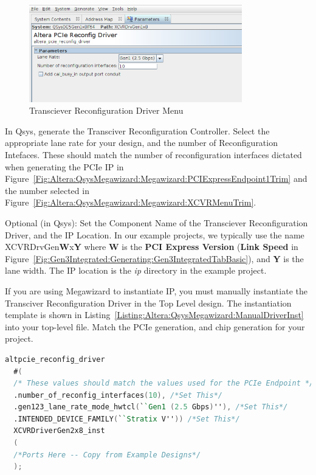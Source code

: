 \documentclass{refrep}
\newcommand{\Directory}[1]{\textit{#1}}
\newcommand{\ConfigSetting}[1]{\textbf{#1}}
\begin{document}
\begin{figure}[H]
  \includegraphics[width=350px,center]{ReconfigDriverMenu.png}
  \caption{Transciever Reconfiguration Driver Menu}
  \label{Fig:Altera:QsysMegawizard:Megawizard:ReconfigDriverMenu}
\end{figure}

In Qsys, generate the Transciver Reconfiguration Controller. Select the
appropriate lane rate for your design, and the number of Reconfiguration
Intefaces. These should match the number of reconfiguration interfaces dictated
when generating the PCIe IP in
Figure~\ref{Fig:Altera:QsysMegawizard:Megawizard:PCIExpressEndpoint1Trim} and
the number selected in
Figure~\ref{Fig:Altera:QsysMegawizard:Megawizard:XCVRMenuTrim}.

Optional (in Qsys): Set the Component Name of the Transciever Reconfiguration
Driver, and the IP Location. In our example projects, we typically use the name
XCVRDrvGen\ConfigSetting{W}x\ConfigSetting{Y} where \ConfigSetting{W} is the
\ConfigSetting{PCI Express Version} (\ConfigSetting{Link Speed} in
Figure~\ref{Fig:Gen3Integrated:Generating:Gen3IntegratedTabBasic}), and
\textbf{Y} is the lane width. The IP location is the \Directory{ip} directory in
the example project.

If you are using Megawizard to instantiate IP, you must manually instantiate the
Transciver Reconfiguration Driver in the Top Level design. The instantiation
template is shown in
Listing~\ref{Listing:Altera:QsysMegawizard:ManualDriverInst} into your top-level
file.  Match the PCIe generation, and chip generation for your project.
\begin{lstlisting}[basicstyle=\footnotesize\ttfamily,language=Verilog,
    commentstyle=\color{red},label=Listing:Altera:QsysMegawizard:ManualDriverInst,
    caption=Manual (non-qsys) instantiation of Reconfiguration Driver,frame=single]
  altpcie_reconfig_driver
  #(
  /* These values should match the values used for the PCIe Endpoint */
  .number_of_reconfig_interfaces(10), /*Set This*/
  .gen123_lane_rate_mode_hwtcl(``Gen1 (2.5 Gbps)''), /*Set This*/
  .INTENDED_DEVICE_FAMILY(``Stratix V'')) /*Set This*/
  XCVRDriverGen2x8_inst
  (
  /*Ports Here -- Copy from Example Designs*/
  );
\end{lstlisting}
\end{document}
